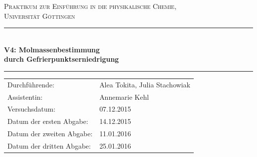 \documentclass[12pt,a4paper,titlepage,headinclude,bibtotoc]{scrartcl}
\begin{document}
\begin{titlepage}
\centering
\textsc{\Large Praktikum zur Einführung in die physikalische Chemie,\\[1.5ex] Universität Göttingen}

\vspace*{0.5cm}

\rule{\textwidth}{1pt}\\[0.5cm]
{\huge \bfseries
  V4: Molmassenbestimmung\\[1.5ex]
  durch Gefrierpunktserniedrigung}\\[0.5cm]
\rule{\textwidth}{1pt}

\vspace*{0.5cm}


\begin{Large}
\begin{tabular}{ll}
Durchführende: &  Alea Tokita, Julia Stachowiak\\
Assistentin: & Annemarie Kehl\\
 Versuchsdatum: & 07.12.2015\\
 Datum der ersten Abgabe: & 14.12.2015\\
 Datum der zweiten Abgabe: & 11.01.2016 \\
 Datum der dritten Abgabe: & 25.01.2016\\
\end{tabular}
\end{Large}

\vspace*{0.5cm}

\begin{Large}
\end{Large}

\end{titlepage}
\end{document}
